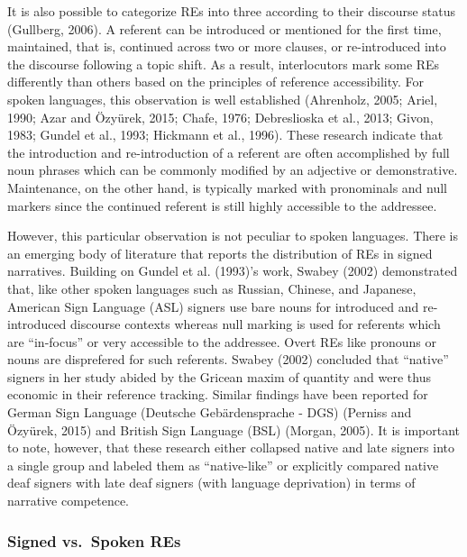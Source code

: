 \documentclass[]{elsarticle} %
\begin{document}
It is also possible to categorize REs into three according to their
discourse status (Gullberg, 2006). A referent can be introduced or
mentioned for the first time, maintained, that is, continued across two
or more clauses, or re-introduced into the discourse following a topic
shift. As a result, interlocutors mark some REs differently than others
based on the principles of reference accessibility. For spoken
languages, this observation is well established (Ahrenholz, 2005; Ariel,
1990; Azar and Özyürek, 2015; Chafe, 1976; Debreslioska et al., 2013;
Givon, 1983; Gundel et al., 1993; Hickmann et al., 1996). These research
indicate that the introduction and re-introduction of a referent are
often accomplished by full noun phrases which can be commonly modified
by an adjective or demonstrative. Maintenance, on the other hand, is
typically marked with pronominals and null markers since the continued
referent is still highly accessible to the addressee.

However, this particular observation is not peculiar to spoken
languages. There is an emerging body of literature that reports the
distribution of REs in signed narratives. Building on Gundel et al.
(1993)'s work, Swabey (2002) demonstrated that, like other spoken
languages such as Russian, Chinese, and Japanese, American Sign Language
(ASL) signers use bare nouns for introduced and re-introduced discourse
contexts whereas null marking is used for referents which are
``in-focus'' or very accessible to the addressee. Overt REs like
pronouns or nouns are disprefered for such referents. Swabey (2002)
concluded that ``native'' signers in her study abided by the Gricean
maxim of quantity and were thus economic in their reference tracking.
Similar findings have been reported for German Sign Language (Deutsche
Gebärdensprache - DGS) (Perniss and Özyürek, 2015) and British Sign
Language (BSL) (Morgan, 2005). It is important to note, however, that
these research either collapsed native and late signers into a single
group and labeled them as ``native-like'' or explicitly compared native
deaf signers with late deaf signers (with language deprivation) in terms
of narrative competence.

\hypertarget{signed-vs.-spoken-res}{%
\subsubsection{Signed vs.~Spoken REs}\label{signed-vs.-spoken-res}}
\end{document}
